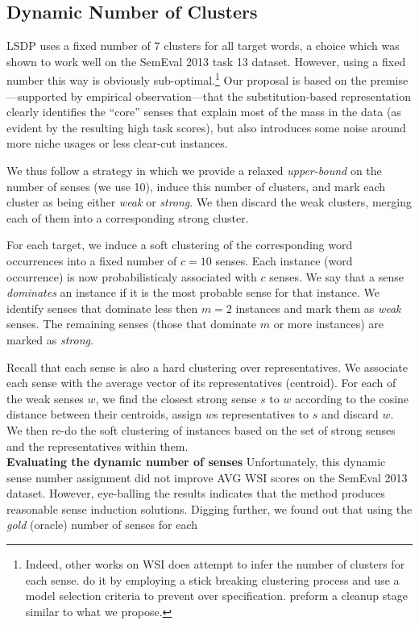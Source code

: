 \documentclass[11pt,a4paper]{article}
\begin{document}
\subsection{Dynamic Number of Clusters}
\label{sec:numc}
LSDP uses a fixed number of 7 clusters for all target words, a choice which was shown to work well on the SemEval 2013 task 13 dataset. However, using a fixed number this way is obviously sub-optimal.\footnote{Indeed, other works on WSI \cite{teh2005sharing,komninos2016structured,hwang2019autosense} does attempt to infer the number of clusters for each sense. \citet{teh2005sharing} do it by employing a stick breaking clustering process and \citet{komninos2016structured} use a model selection criteria to prevent over specification.\citet{hwang2019autosense} preform a cleanup stage similar to what we propose.  } %
Our proposal is based on the premise---supported by empirical observation---that the substitution-based representation clearly identifies the ``core'' senses that explain most of the mass in the data (as evident by the resulting high task scores), but also introduces some noise around more niche usages or less clear-cut instances.

We thus follow a strategy in which we provide a relaxed \emph{upper-bound} on the number of senses (we use 10), induce this number of clusters, and mark each cluster as being either \emph{weak} or \emph{strong}.  We then discard the weak clusters, merging each of them into a corresponding strong cluster. 

For each target, we induce a soft clustering of the corresponding word occurrences into a fixed number of $c=10$ senses. Each instance (word occurrence) is now probabilisticaly associated with $c$ senses. We say that a sense \emph{dominates} an instance if it is the most probable sense for that instance. We identify senses that dominate less then $m=2$ instances and mark them as \emph{weak} senses. The remaining senses (those that dominate $m$ or more instances) are marked as \emph{strong}. 

Recall that each sense is also a hard clustering over representatives. We associate each sense with the average vector of its representatives (centroid).
For each of the weak senses $w$, we find the closest strong sense $s$ to $w$ according to the cosine distance between their centroids, assign $w$s representatives to $s$ and discard $w$. We then re-do the soft clustering of instances based on the set of strong senses and the representatives within them.
\\[0.5em]
\noindent\textbf{Evaluating the dynamic number of senses}
Unfortunately, this dynamic sense number assignment did not improve AVG WSI scores on the SemEval 2013 dataset.
However, eye-balling the results indicates that the method produces reasonable sense induction solutions.
Digging further, we found out that using the \emph{gold} (oracle) number of senses for each
\end{document}
